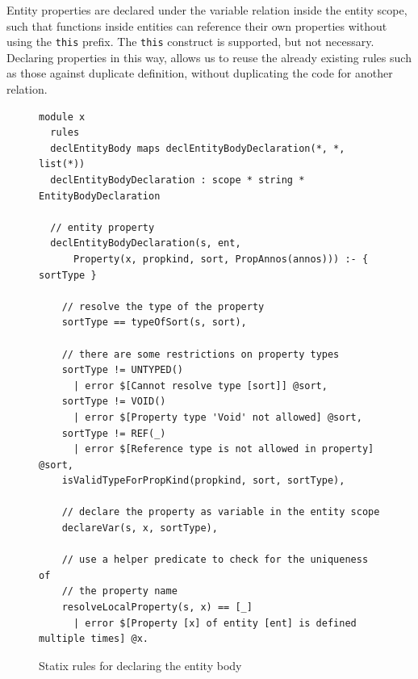       Entity properties are declared under the variable relation inside the entity scope, such that functions inside entities can reference their own properties without using the \texttt{this} prefix. The \texttt{this} construct is supported, but not necessary. Declaring properties in this way, allows us to reuse the already existing rules such as those against duplicate definition, without duplicating the code for another relation.

      \begin{figure}
        \begin{verbatim}
module x
  rules
  declEntityBody maps declEntityBodyDeclaration(*, *, list(*))
  declEntityBodyDeclaration : scope * string * EntityBodyDeclaration

  // entity property
  declEntityBodyDeclaration(s, ent, 
      Property(x, propkind, sort, PropAnnos(annos))) :- { sortType }

    // resolve the type of the property
    sortType == typeOfSort(s, sort),

    // there are some restrictions on property types
    sortType != UNTYPED()
      | error $[Cannot resolve type [sort]] @sort,
    sortType != VOID()
      | error $[Property type 'Void' not allowed] @sort,
    sortType != REF(_)
      | error $[Reference type is not allowed in property] @sort,
    isValidTypeForPropKind(propkind, sort, sortType),

    // declare the property as variable in the entity scope
    declareVar(s, x, sortType),

    // use a helper predicate to check for the uniqueness of
    // the property name
    resolveLocalProperty(s, x) == [_]
      | error $[Property [x] of entity [ent] is defined multiple times] @x.
        \end{verbatim}
        \caption{\label{fig:webdsl-entity-body-declaration}Statix rules for declaring the entity body}
      \end{figure}

